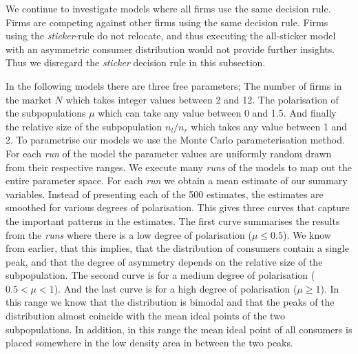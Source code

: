 \documentclass[preprint, 12pt]{elsarticle}
\begin{document}
We continue to investigate models where all firms use the same decision rule. Firms are competing against other firms using the same decision rule. Firms using the \emph{sticker}-rule do not relocate, and thus executing the all-sticker model with an asymmetric consumer distribution would not provide further insights. Thus we disregard the \emph{sticker} decision rule in this subsection. 

In the following models there are three free parameters; The number of firms in the market $N$ which takes integer values between 2 and 12. The polarisation of the subpopulations $\mu$ which can take any value between 0 and 1.5. And finally the relative size of the subpopulation $n_l/n_r$ which takes any value between 1 and 2. To parametrise our models we use the Monte Carlo parameterisation method. For each \emph{run} of the model the parameter values are uniformly random drawn from their respective ranges. We execute many \emph{runs} of the models to map out the entire parameter space. For each \emph{run} we obtain a mean estimate of our summary variables. Instead of presenting each of the 500 estimates, the estimates are smoothed for various degrees of polarisation. This gives three curves that capture the important patterns in the estimates. The first curve summarises the results from the \emph{runs} where there is a low degree of polarisation ($\mu \le 0.5$). We know from earlier, that this implies, that the distribution of consumers contain a single peak, and that the degree of asymmetry depends on the relative size of the subpopulation. The second curve is for a medium degree of polarisation ($0.5 < \mu < 1$). And the last curve is for a high degree of polarisation ($\mu \ge 1$). In this range we know that the distribution is bimodal and that the peaks of the distribution almost coincide with the mean ideal points of the two subpopulations. In addition, in this range the mean ideal point of all consumers is placed somewhere in the low density area in between the two peaks.
\end{document}
